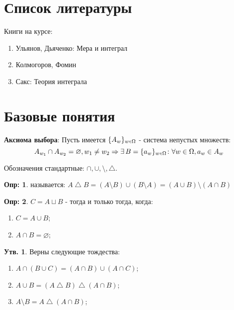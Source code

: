 \documentclass[12pt]{article}
\theoremstyle{definition}
\newtheorem{defn}{Опр:}
\newtheorem{prop}{Утв.}
\newcommand{\smallerrel}[1]{\mathrel{\mathpalette\smallerrelaux{#1}}}
\newcommand{\smallerrelaux}[2]{\raisebox{.1ex}{\scalebox{.75}{$#1#2$}}}
\newcommand{\smallin}{\smallerrel{\in}}
\begin{document}

\section*{Список литературы}
Книги на курсе: 
\begin{enumerate}
	\item Ульянов, Дьяченко: Мера и интеграл
	\item Колмогоров, Фомин
	\item Сакс: Теория интеграла
\end{enumerate}

\section*{Базовые понятия}

\textbf{Аксиома выбора}: Пусть имеется $\{A_w\}_{w \smallin \Omega}$ - система непустых множеств: 
$$
	A_{w_1} \cap A_{w_2} = \varnothing, w_1 \neq w_2 \Rightarrow \exists \, B = \{a_w\}_{w \smallin \Omega} \colon \forall w \in \Omega, a_w \in A_w
$$

Обозначения стандартные: $\cap, \cup, \setminus, \bigtriangleup$. 
\begin{defn}
	 называется: $A \bigtriangleup B = (A\setminus B)\cup(B \setminus A) = (A\cup B)\setminus(A\cap B)$
\end{defn}

\begin{defn}
	$C = A\sqcup B$ -  тогда и только тогда, когда: 
	\begin{enumerate}[label=(\arabic*)]
		\item $C = A \cup B$;
		\item $A \cap B = \varnothing$;
	\end{enumerate}
\end{defn}

\begin{prop}
	Верны следующие тождества: 
	\begin{enumerate}[ label={(\arabic*)}]
		\item $A \cap (B \cup C) = (A\cap B) \cup (A\cap C)$;
		\item $A \cup B = (A \bigtriangleup B) \bigtriangleup(A \cap B)$;
		\item $A \setminus B = A \bigtriangleup (A \cap B)$;
	\end{enumerate}	
\end{prop}
\end{document}
